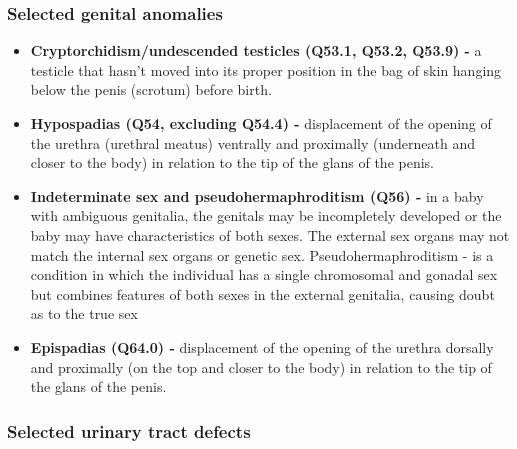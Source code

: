 \documentclass[
]{krantz}
\begin{document}
\hypertarget{section-2117}{%
\subsubsection{Selected genital anomalies}\label{section-2117}}

\begin{itemize}
\item
  \textbf{Cryptorchidism/undescended testicles (Q53.1, Q53.2, Q53.9) -} a testicle that hasn't moved into its proper position in the bag of skin hanging below the penis (scrotum) before birth.
\item
  \textbf{Hypospadias (Q54, excluding Q54.4) -} displacement of the opening of the urethra (urethral meatus) ventrally and proximally (underneath and closer to the body) in relation to the tip of the glans of the penis.
\item
  \textbf{Indeterminate sex and pseudohermaphroditism (Q56) -} in a baby with ambiguous genitalia, the genitals may be incompletely developed or the baby may have characteristics of both sexes. The external sex organs may not match the internal sex organs or genetic sex. Pseudohermaphroditism - is a condition in which the individual has a single chromosomal and gonadal sex but combines features of both sexes in the external genitalia, causing doubt as to the true sex
\item
  \textbf{Epispadias (Q64.0) -} displacement of the opening of the urethra dorsally and proximally (on the top and closer to the body) in relation to the tip of the glans of the penis.
\end{itemize}

\hypertarget{section-2118}{%
\subsubsection{Selected urinary tract defects}\label{section-2118}}
\end{document}
